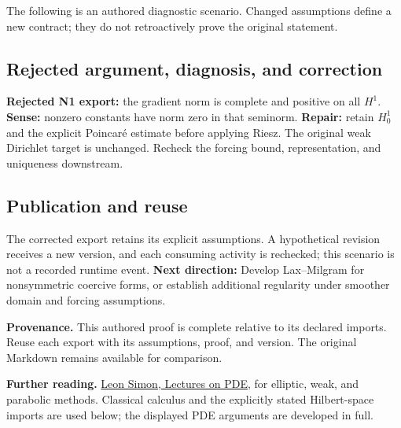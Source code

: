 \documentclass[preprint,12pt,aps,pra,showkeys,amsmath,amssymb,superscriptaddress,floatfix]{revtex4-2}
\theoremstyle{definition}
\theoremstyle{remark}
\begin{document}
The following is an authored diagnostic scenario. Changed assumptions
define a new contract; they do not retroactively prove the original
statement.

\subsection{Rejected argument, diagnosis, and correction}
\textbf{Rejected N1 export:} the gradient norm is complete and positive
on all \(H^1\). \textbf{Sense:} nonzero constants have norm zero in that
seminorm. \textbf{Repair:} retain \(H_0^1\) and the explicit Poincaré
estimate before applying Riesz. The original weak Dirichlet target is
unchanged. Recheck the forcing bound, representation, and uniqueness
downstream.

\subsection{Publication and reuse}
The corrected export retains its explicit assumptions. A hypothetical
revision receives a new version, and each consuming activity is
rechecked; this scenario is not a recorded runtime event. \textbf{Next
direction:} Develop Lax--Milgram for nonsymmetric coercive forms, or
establish additional regularity under smoother domain and forcing
assumptions.

\par\medskip\begingroup\small\linespread{1.0}\selectfont\noindent\textbf{Provenance.} This authored proof is complete relative to its declared imports. Reuse
each export with its assumptions, proof, and version. The original
Markdown remains available for comparison.
\par\endgroup

\par\smallskip\begingroup\small\linespread{1.0}\selectfont\noindent\textbf{Further reading.} \href{https://math.stanford.edu/~lms/lecs-on-pde.pdf}{Leon Simon,
Lectures on PDE}, for elliptic, weak, and parabolic methods. Classical
calculus and the explicitly stated Hilbert-space imports are used below;
the displayed PDE arguments are developed in full.\par\endgroup
\end{document}
